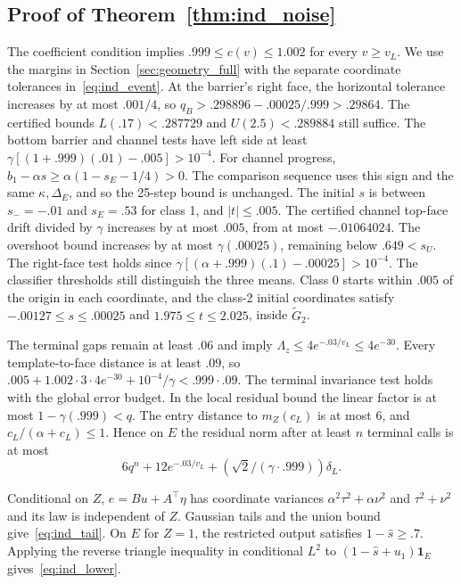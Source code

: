 \subsection{Proof of Theorem~\ref{thm:ind_noise}}
The coefficient condition implies $.999\le c(v)\le1.002$ for every $v\ge v_L$.
We use the margins in Section~\ref{sec:geometry_full} with the separate coordinate tolerances
in~\eqref{eq:ind_event}. At the barrier's right face, the horizontal
tolerance increases by at most $.001/4$, so $q_B>.298896-.00025/.999>.29864$.
The certified bounds $L(.17)<.287729$ and $U(2.5)<.289884$ still suffice.
The bottom barrier and channel tests have left side at least
$\gamma[(1+.999)(.01)-.005]>10^{-4}$.
For channel progress, $b_1-\alpha s\ge \alpha(1-s_E-1/4)>0$.
The comparison sequence uses this sign and the same $\kappa,\Delta_E$,
and so the 25-step bound is unchanged. The initial $s$ is between
$s_-=-.01$ and $s_E=.53$ for class 1, and $|t|\le.005$.
The certified channel top-face drift divided by $\gamma$ increases
by at most $.005$, from at most $-.01064024$.
The overshoot bound increases by at most $\gamma(.00025)$, remaining
below $.649<s_U$. The right-face test holds since
$\gamma[(\alpha+.999)(.1)-.00025]>10^{-4}$.
The classifier thresholds still distinguish the three means.
Class 0 starts within $.005$ of the origin in each coordinate, and
the class-2 initial coordinates satisfy $-.00127\le s\le .00025$
and $1.975\le t\le2.025$, inside $\widetilde G_2$.

The terminal gaps remain at least $.06$ and imply
$\Lambda_z\le4e^{-.03/v_L}\le4e^{-30}$.
Every template-to-face distance is at least $.09$, so
$.005+1.002\cdot3\cdot4e^{-30}+10^{-4}/\gamma<.999\cdot .09$.
The terminal invariance test holds with the global error budget.
In the local residual bound the linear factor is at most $1-\gamma(.999)<q$.
The entry distance to $m_Z(c_L)$ is at most 6, and
$c_L/(\alpha+c_L)\le1$. Hence on $E$ the residual norm after at least $n$
terminal calls is at most
\[
 6q^n+12e^{-.03/v_L}+(\sqrt{2}/(\gamma\cdot.999))\delta_L .
\]

Conditional on $Z$, $e=Bu+A^\top\eta$ has coordinate variances
$\alpha^2\tau^2+\alpha\nu^2$ and $\tau^2+\nu^2$ and its law is independent of $Z$.
Gaussian tails and the union bound give~\eqref{eq:ind_tail}.
On $E$ for $Z=1$, the restricted output satisfies $1-\widehat s\ge .7$.
Applying the reverse triangle inequality in conditional $L^2$ to
$(1-\widehat s+u_1)\mathbf{1}_E$ gives~\eqref{eq:ind_lower}.

